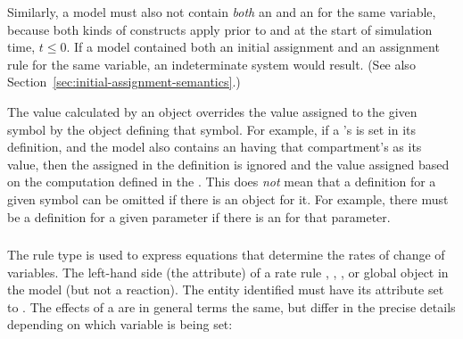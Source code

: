 Similarly, a model must also not contain \emph{both} an
\AssignmentRule and an \InitialAssignment for the same variable,
because both kinds of constructs apply prior to and at the start
of simulation time, \ie $t \leq 0$.  If a model contained both an
initial assignment and an assignment rule for the same variable,
an indeterminate system would result.  (See also
Section~\ref{sec:initial-assignment-semantics}.)

The value calculated by an \AssignmentRule object overrides the
value assigned to the given symbol by the object defining that
symbol.  For example, if a \Compartment's  is set in
its definition, and the model also contains an \AssignmentRule
having that compartment's  as its 
value, then the  assigned in the \Compartment
definition is ignored and the value assigned based on the
computation defined in the \AssignmentRule.  This does \emph{not}
mean that a definition for a given symbol can be omitted if there
is an \AssignmentRule object for it.  For example, there must be a
\Parameter definition for a given parameter if there is an
\AssignmentRule for that parameter.


\subsubsection{}
\label{sec:raterule}

The rule type \RateRule is used to express equations that
determine the rates of change of variables.  The left-hand side
(the   attribute) of a rate rule 
\Species, \SpeciesReference, \Compartment, 
or global \Parameter object in
the model (but not a reaction).  The
entity identified must have its  attribute set to
.  The effects of a \RateRule are in general terms the
same, but differ in the precise details depending on which
variable is being set:

